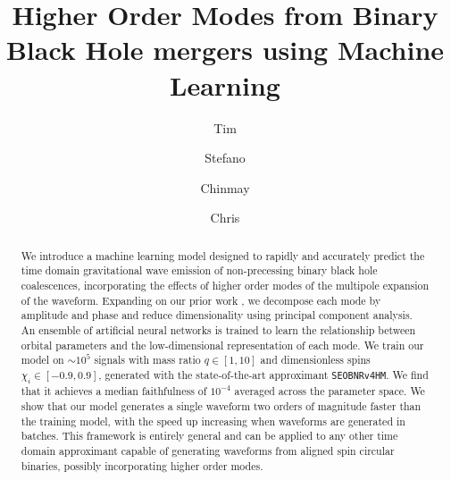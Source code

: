 \documentclass[twocolumn,showpacs,preprintnumbers,nofootinbib,prd,
superscriptaddress,10pt]{revtex4-1}
\begin{document}
\begin{abstract}
We introduce a machine learning model designed to rapidly and accurately predict the time domain gravitational wave emission of non-precessing binary black hole coalescences, incorporating the effects of higher order modes of the multipole expansion of the waveform. 
Expanding on our prior work \cite{Schmidt:2020yuu}, we decompose each mode by amplitude and phase and reduce dimensionality using principal component analysis. An ensemble of artificial neural networks is trained to learn the relationship between orbital parameters and the low-dimensional representation of each mode.
We train our model on $\sim 10^5$ signals with mass ratio $q \in [1,10]$ and dimensionless spins $\chi_i \in [-0.9, 0.9]$, generated with the state-of-the-art approximant \texttt{SEOBNRv4HM}. We find that it achieves a median faithfulness of $10^{-4}$ averaged across the parameter space. We show that our model generates a single waveform two orders of magnitude faster than the training model, with the speed up increasing when waveforms are generated in batches.
This framework is entirely general and can be applied to any other time domain approximant capable of generating waveforms from aligned spin circular binaries, possibly incorporating higher order modes.
\end{abstract}
	
	\title{Higher Order Modes from Binary Black Hole mergers using Machine Learning}
	\author{Tim }
	\author{Stefano  }
	\author{Chinmay }
	\author{Chris }
	\maketitle
\end{document}
